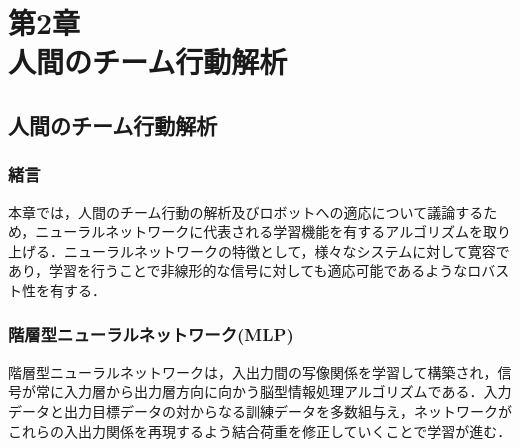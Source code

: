 \part*{第2章\\人間のチーム行動解析}
\chapter{人間のチーム行動解析}
%
\section{緒言}
本章では，人間のチーム行動の解析及びロボットへの適応について議論するため，ニューラルネットワークに代表される学習機能を有するアルゴリズムを取り上げる．ニューラルネットワークの特徴として，様々なシステムに対して寛容であり，学習を行うことで非線形的な信号に対しても適応可能であるようなロバスト性を有する．

%
\clearpage
\section{階層型ニューラルネットワーク(MLP)}
階層型ニューラルネットワークは，入出力間の写像関係を学習して構築され，信号が常に入力層から出力層方向に向かう脳型情報処理アルゴリズムである．入力データと出力目標データの対からなる訓練データを多数組与え，ネットワークがこれらの入出力関係を再現するよう結合荷重を修正していくことで学習が進む．

%
\clearpage
